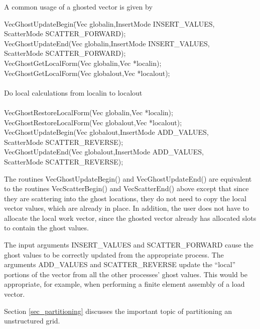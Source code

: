 A common usage of a ghosted vector is given by
\begin{tabbing}
  VecGhostUpdateBegin\=(Vec globalin,InsertMode INSERT_VALUES,\\
                      \>             ScatterMode SCATTER_FORWARD);\\
  VecGhostUpdateEnd(Vec globalin,InsertMode INSERT_VALUES,\\
                      \>           ScatterMode SCATTER_FORWARD);\\
  VecGhostGetLocalForm(Vec globalin,Vec *localin);\\
  VecGhostGetLocalForm(Vec globalout,Vec *localout);\\
   \trl{/*}\\
      Do local calculations from localin to localout \\
   \trl{*/}\\
  VecGhostRestoreLocalForm(Vec globalin,Vec *localin);\\
  VecGhostRestoreLocalForm(Vec globalout,Vec *localout);\\
  VecGhostUpdateBegin(Vec globalout,InsertMode ADD_VALUES,\\
                        \>            ScatterMode SCATTER_REVERSE);\\
  VecGhostUpdateEnd(Vec globalout,InsertMode ADD_VALUES,\\
                        \>          ScatterMode SCATTER_REVERSE);
\end{tabbing}
      
The routines VecGhostUpdateBegin() and VecGhostUpdateEnd() are equivalent to the routines VecScatterBegin() and VecScatterEnd()
above except that since they are scattering into the ghost locations, they do not need
to copy the local vector values, which are already in place. In addition, the user does not
have to allocate the local work vector, since the ghosted vector already has allocated 
slots to contain the ghost values.

The input arguments INSERT_VALUES and SCATTER_FORWARD
cause the ghost values to be correctly updated from the appropriate
process. The arguments ADD_VALUES and SCATTER_REVERSE
update the ``local'' portions of the vector from all the other
processes' ghost values.  This would be appropriate, for example,
when performing a finite element assembly of a load vector.

Section \ref{sec_partitioning} discusses the important topic of partitioning 
an unstructured grid.


